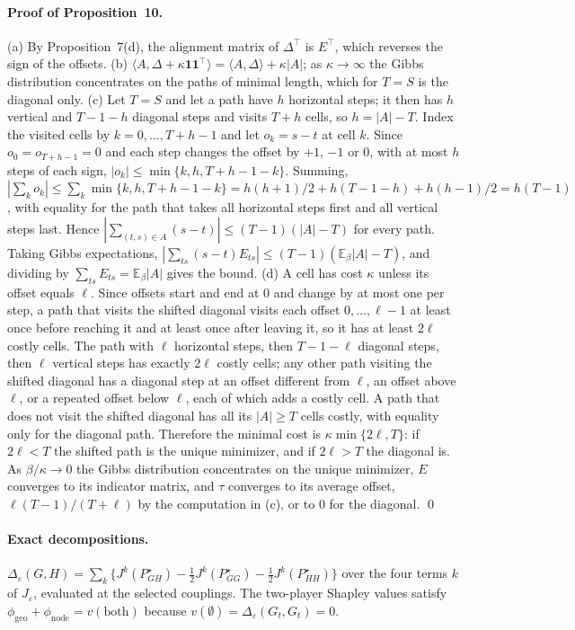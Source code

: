 \documentclass[12pt]{article}
\begin{document}
\paragraph{Proof of Proposition~10.}
(a) By Proposition~7(d), the alignment matrix of $\Delta^\top$ is $E^\top$, which reverses the sign of the offsets. (b) $\langle A,\Delta+\kappa\mathbf1\mathbf1^\top\rangle=\langle A,\Delta\rangle+\kappa|A|$; as $\kappa\to\infty$ the Gibbs distribution concentrates on the paths of minimal length, which for $T=S$ is the diagonal only.
(c) Let $T=S$ and let a path have $h$ horizontal steps; it then has $h$ vertical and $T-1-h$ diagonal steps and visits $T+h$ cells, so $h=|A|-T$. Index the visited cells by $k=0,\dots,T+h-1$ and let $o_k=s-t$ at cell $k$. Since $o_0=o_{T+h-1}=0$ and each step changes the offset by $+1$, $-1$ or $0$, with at most $h$ steps of each sign, $|o_k|\le\min\{k,h,T+h-1-k\}$. Summing, $|\sum_ko_k|\le\sum_k\min\{k,h,T+h-1-k\}=h(h+1)/2+h(T-1-h)+h(h-1)/2=h(T-1)$, with equality for the path that takes all horizontal steps first and all vertical steps last. Hence $|\sum_{(t,s)\in A}(s-t)|\le(T-1)(|A|-T)$ for every path. Taking Gibbs expectations, $|\sum_{ts}(s-t)E_{ts}|\le(T-1)(\mathbb E_\beta|A|-T)$, and dividing by $\sum_{ts}E_{ts}=\mathbb E_\beta|A|$ gives the bound.
(d) A cell has cost $\kappa$ unless its offset equals $\ell$. Since offsets start and end at $0$ and change by at most one per step, a path that visits the shifted diagonal visits each offset $0,\dots,\ell-1$ at least once before reaching it and at least once after leaving it, so it has at least $2\ell$ costly cells. The path with $\ell$ horizontal steps, then $T-1-\ell$ diagonal steps, then $\ell$ vertical steps has exactly $2\ell$ costly cells; any other path visiting the shifted diagonal has a diagonal step at an offset different from $\ell$, an offset above $\ell$, or a repeated offset below $\ell$, each of which adds a costly cell. A path that does not visit the shifted diagonal has all its $|A|\ge T$ cells costly, with equality only for the diagonal path. Therefore the minimal cost is $\kappa\min\{2\ell,T\}$: if $2\ell<T$ the shifted path is the unique minimizer, and if $2\ell>T$ the diagonal is. As $\beta/\kappa\to0$ the Gibbs distribution concentrates on the unique minimizer, $E$ converges to its indicator matrix, and $\tau$ converges to its average offset, $\ell(T-1)/(T+\ell)$ by the computation in (c), or to $0$ for the diagonal. \qed

\paragraph{Exact decompositions.}
$\Delta_\varepsilon(G,H)=\sum_k\{J^k(P^\star_{GH})-\frac12J^k(P^\star_{GG})-\frac12J^k(P^\star_{HH})\}$ over the four terms $k$ of $J_\varepsilon$, evaluated at the selected couplings. The two-player Shapley values satisfy $\phi_{\mathrm{geo}}+\phi_{\mathrm{node}}=v(\mathrm{both})$ because $v(\emptyset)=\Delta_\varepsilon(G_t,G_t)=0$.
\end{document}
